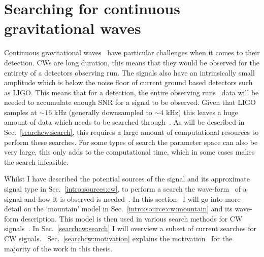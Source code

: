 \chapter{\label{searchcw}Searching for continuous gravitational waves}

Continuous gravitational waves~ have
particular challenges when it comes to their detection.  \glspl{CW} are long
duration, this means that they would be observed for the entirety of a
detectors observing run.  The signals also have an intrinsically small
amplitude which is below the noise floor of current ground based detectors such
as \gls{LIGO}.  This means that for a detection, the entire observing
runs~ data will be needed to
accumulate enough \gls{SNR} for a signal to be observed.  Given that \gls{LIGO}
samples at $\sim 16$ kHz (generally downsampled to $\sim 4$ kHz) this leaves a
huge amount of data which needs to be searched through~.  As will be described in Sec.~\ref{searchcw:search}, this
requires a large amount of computational resources to perform these searches.
For some types of search the parameter space can also be very large, this only
adds to the computational time, which in some cases makes the search
infeasible.

Whilst I have described the potential sources of the signal and its approximate
signal type in Sec.~\ref{intro:sources:cw}, to perform a search the
wave-form~ of a signal
and how it is observed is needed~.  In this
section~ I will go into more
detail on the `mountain' model in Sec.~\ref{intro:source:cw:mountain} and its
wave-form description.  This model is then used in various search methods for
\gls{CW} signals~. In
Sec.~\ref{searchcw:search} I will overview a subset of current searches for
\gls{CW} signals.~
Sec.~\ref{searchcw:motivation} explains the motivation~ for the majority of the work in this thesis.

